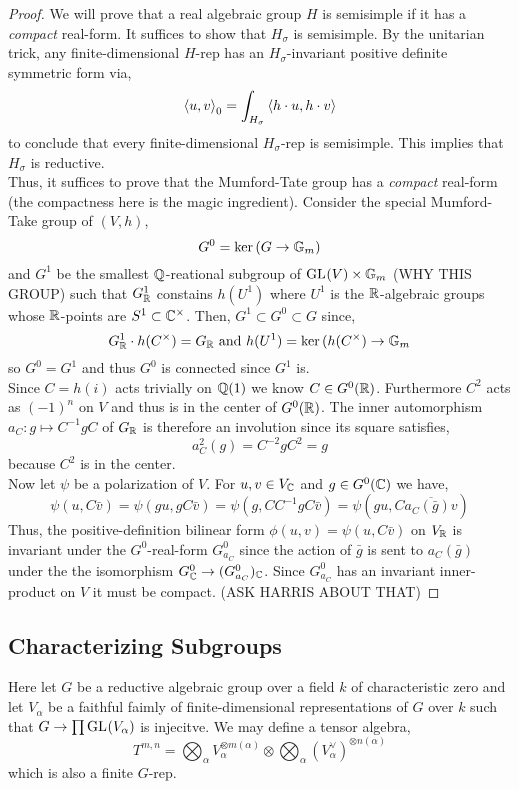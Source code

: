 \documentclass[12pt]{article}
\begin{document}
\begin{proof}
We will prove that a real algebraic group $H$ is semisimple if it has a \textit{compact} real-form. It suffices to show that $H_\sigma$ is semisimple. By the unitarian trick, any finite-dimensional $H$-rep has an $H_\sigma$-invariant positive definite symmetric form via,
\[ \left< u, v \right>_0 = \int_{H_\sigma} \left< h \cdot u, h \cdot v \right> \]
to conclude that every finite-dimensional $H_\sigma$-rep is semisimple. This implies that $H_\sigma$ is reductive. 
\bigskip\\
Thus, it suffices to prove that the Mumford-Tate group has a \textit{compact} real-form (the compactness here is the magic ingredient). Consider the special Mumford-Take group of $(V, h)$,
\[ G^0 = \ker{(G \to \mathbb{G}_m)} \]
and $G^1$ be the smallest $\mathbb{Q}$-reational subgroup of $\mathrm{GL}_{}(V) \times \mathbb{G}_m$ (WHY THIS GROUP) such that $G^1_{\mathbb{R}}$ constains $h(U^1)$ where $U^1$ is the $\mathbb{R}$-algebraic groups whose $\mathbb{R}$-points are $S^1 \subset \mathbb{C}^\times$. Then, $G^1 \subset G^0 \subset G$ since,
\[ G^1_{\mathbb{R}} \cdot h(C^\times) = G_{\mathbb{R}} \text{ and } h(U^1) = \ker{(h(C^\times) \to \mathbb{G}_m} \]
so $G^0 = G^1$ and thus $G^0$ is connected since $G^1$ is.
\bigskip\\
Since $C = h(i)$ acts trivially on $\mathbb{Q}(1)$ we know $C \in G^0(\mathbb{R})$. Furthermore $C^2$ acts as $(-1)^n$ on $V$ and thus is in the center of $G^0(\mathbb{R})$. The inner automorphism $a_C : g \mapsto C^{-1} g C$ of $G_{\mathbb{R}}$ is therefore an involution since its square satisfies,
\[ a_C^2(g) = C^{-2} g C^{2} = g \]
because $C^2$ is in the center.
\bigskip\\
Now let $\psi$ be a polarization of $V$. For $u,v \in V_{\mathbb{C}}$ and $g \in G^0(\mathbb{C})$ we have,
\[ \psi(u, C \bar{v}) = \psi(gu, g C \bar{v}) = \psi(g , C C^{-1} g C \bar{v}) = \psi(gu, C \overline{ a_C(\bar{g}) v}) \]
Thus, the positive-definition bilinear form $\phi(u,v) = \psi(u, C \bar{v})$ on $V_{\mathbb{R}}$ is invariant under the $G^0$-real-form $G^0_{a_C}$ since the action of $\bar{g}$ is sent to $a_C (\bar{g})$ under the the isomorphism $G^0_{\mathbb{C}} \to (G^0_{a_C})_{\mathbb{C}}$. Since $G^0_{a_C}$ has an invariant inner-product on $V$ it must be compact. (ASK HARRIS ABOUT THAT)
\end{proof}


\subsection{Characterizing Subgroups}

Here let $G$ be a reductive algebraic group over  a field $k$ of characteristic zero and let $V_\alpha$ be a faithful faimly of finite-dimensional representations of $G$ over $k$ such that $G \to \prod \mathrm{GL}_{}(V_\alpha)$ is injecitve. We may define a tensor algebra,
\[ T^{m,n} = \bigotimes_\alpha V_\alpha^{\otimes m(\alpha)} \otimes \bigotimes_{\alpha} (V_\alpha^\vee)^{\otimes n(\alpha)} \]
which is also a finite $G$-rep. 
\end{document}
